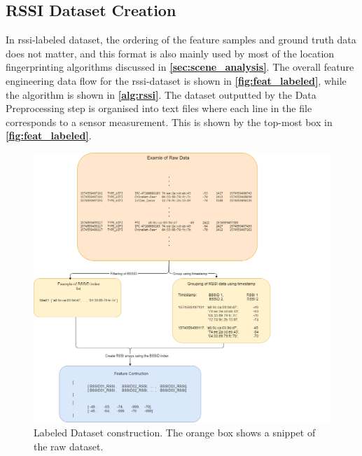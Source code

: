 \subsection{RSSI Dataset Creation} 
In \gls{rssi}-labeled dataset, the ordering of the feature samples and ground truth data does not matter, and this format is also mainly used by most of the location fingerprinting algorithms discussed in \textbf{\autoref{sec:scene_analysis}}.
The overall feature engineering data flow for the \gls{rssi}-dataset is shown in \textbf{\autoref{fig:feat_labeled}}, while the algorithm is shown in \textbf{\autoref{alg:rssi}}. The dataset outputted by the Data Preprocessing step is organised into text files where each line in the file corresponds to a sensor measurement. This is shown by the top-most box in \textbf{\autoref{fig:feat_labeled}}.

\begin{figure}[H]
    \centering
    \includegraphics[width=1\textwidth]{Images/DataStandard/feat_eng_labeled (1).png}
    \caption{Labeled Dataset construction. The orange box shows a snippet of the raw dataset. }
    \label{fig:feat_labeled}
\end{figure}

